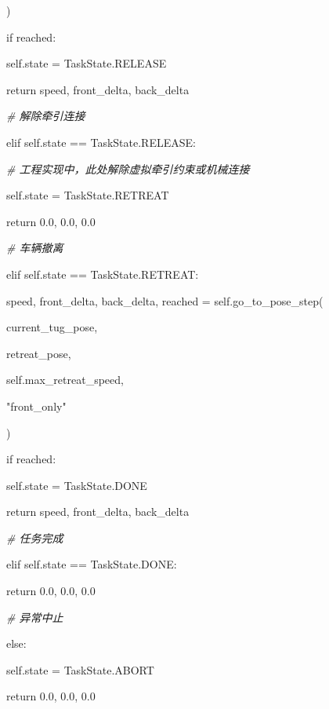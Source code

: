             )

            if reached:

                self.state = TaskState.RELEASE

            return speed, front\_delta, back\_delta

        \emph{\# 解除牵引连接}

        elif self.state == TaskState.RELEASE:

            \emph{\# 工程实现中，此处解除虚拟牵引约束或机械连接}

            self.state = TaskState.RETREAT

            return 0.0, 0.0, 0.0

        \emph{\# 车辆撤离}

        elif self.state == TaskState.RETREAT:

            speed, front\_delta, back\_delta, reached = self.go\_to\_pose\_step(

                current\_tug\_pose,

                retreat\_pose,

                self.max\_retreat\_speed,

                "front\_only"

            )

            if reached:

                self.state = TaskState.DONE

            return speed, front\_delta, back\_delta

        \emph{\# 任务完成}

        elif self.state == TaskState.DONE:

            return 0.0, 0.0, 0.0

        \emph{\# 异常中止}

        else:

            self.state = TaskState.ABORT

            return 0.0, 0.0, 0.0



